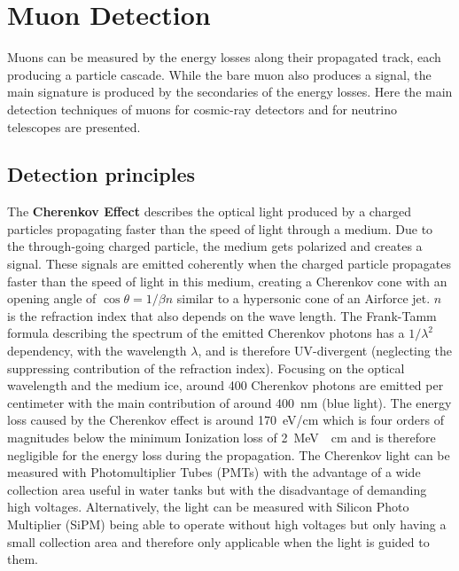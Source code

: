 \chapter{Muon Detection} \label{sec:detection}

Muons can be measured by the energy losses along their propagated track, each producing a particle cascade.
While the bare muon also produces a signal, the main signature is produced by the secondaries of the energy losses.
Here the main detection techniques of muons for cosmic-ray detectors and for neutrino telescopes are presented.

\section{Detection principles}

The \textbf{Cherenkov Effect} \cite{Cherenkov34} describes the optical light produced by a charged particles propagating faster than the speed of light through a medium.
Due to the through-going charged particle, the medium gets polarized and creates a signal.
These signals are emitted coherently when the charged particle propagates faster than the speed of light in this medium, creating a Cherenkov cone with an opening angle of $\cos \theta = 1/\beta n$ similar to a hypersonic cone of an Airforce jet.
$n$ is the refraction index that also depends on the wave length.
The Frank-Tamm formula \cite{FrankTamm37} describing the spectrum of the emitted Cherenkov photons has a $1/\lambda^2$ dependency, with the wavelength $\lambda$, and is therefore UV-divergent (neglecting the suppressing contribution of the refraction index).
Focusing on the optical wavelength and the medium ice, around \num{400} Cherenkov photons are emitted per centimeter with the main contribution of around \SI{400}{nm} (blue light).
The energy loss caused by the Cherenkov effect is around \SI{170}{eV/cm} which is four orders of magnitudes below the minimum Ionization loss of \SI{2}{MeV.\per.cm} and is therefore negligible for the energy loss during the propagation.
The Cherenkov light can be measured with Photomultiplier Tubes (PMTs) with the advantage of a wide collection area useful in water tanks but with the disadvantage of demanding high voltages.
Alternatively, the light can be measured with Silicon Photo Multiplier (SiPM) being able to operate without high voltages but only having a small collection area and therefore only applicable when the light is guided to them.

